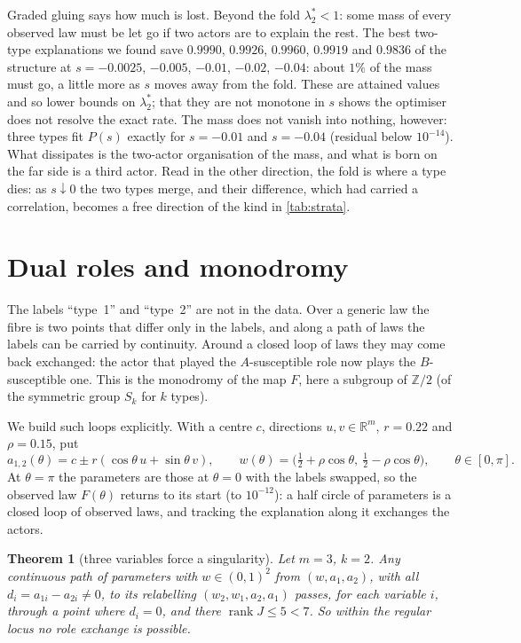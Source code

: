 \documentclass[11pt]{article}
\newtheorem{theorem}{Theorem}\newtheorem{proposition}[theorem]{Proposition}\newtheorem{corollary}[theorem]{Corollary}
\theoremstyle{definition}\newtheorem{definition}[theorem]{Definition}\newtheorem{remark}[theorem]{Remark}\newtheorem{example}[theorem]{Example}
\newcommand{\R}{\mathbb R}
\DeclareMathOperator{\rank}{rank}\DeclareMathOperator{\im}{im}\DeclareMathOperator{\coker}{coker}\DeclareMathOperator{\Spec}{Spec}
\begin{document}
Graded gluing says how much is lost. Beyond the fold $\lambda^*_2<1$: some mass of every observed law must be let go if two actors are to
explain the rest. The best two-type explanations we found save $0.9990$, $0.9926$, $0.9960$, $0.9919$ and $0.9836$ of the structure at $s=-0.0025$, $-0.005$, $-0.01$, $-0.02$, $-0.04$: about $1\%$ of the mass must go, a little more as $s$ moves away from the fold. These are attained values and so lower bounds on $\lambda^*_2$; that they are not monotone in $s$ shows the optimiser does not resolve the exact rate. The mass does not vanish into nothing, however: three
types fit $P(s)$ exactly for $s=-0.01$ and $s=-0.04$ (residual below $10^{-14}$). What dissipates is the two-actor organisation of the
mass, and what is born on the far side is a third actor. Read in the other direction, the fold is where a type dies: as $s\downarrow0$
the two types merge, and their difference, which had carried a correlation, becomes a free direction of the kind in \cref{tab:strata}.

\section{Dual roles and monodromy}\label{sec:monodromy}

The labels ``type~1'' and ``type~2'' are not in the data. Over a generic law the fibre is two points that differ only in the labels, and
along a path of laws the labels can be carried by continuity. Around a closed loop of laws they may come back exchanged: the actor that
played the $A$-susceptible role now plays the $B$-susceptible one. This is the monodromy of the map $F$, here a subgroup of $\mathbb Z/2$
(of the symmetric group $S_k$ for $k$ types).

We build such loops explicitly. With a centre $c$, directions $u,v\in\R^m$, $r=0.22$ and $\rho=0.15$, put
\[
  a_{1,2}(\theta)=c\pm r(\cos\theta\,u+\sin\theta\,v),\qquad w(\theta)=\big(\tfrac12+\rho\cos\theta,\ \tfrac12-\rho\cos\theta\big),
  \qquad\theta\in[0,\pi].
\]
At $\theta=\pi$ the parameters are those at $\theta=0$ with the labels swapped, so the observed law $F(\theta)$ returns to its start (to
$10^{-12}$): a half circle of parameters is a closed loop of observed laws, and tracking the explanation along it exchanges the actors.

\begin{theorem}[three variables force a singularity]\label{thm:m3}
Let $m=3$, $k=2$. Any continuous path of parameters with $w\in(0,1)^2$ from $(w,a_1,a_2)$, with all $d_i=a_{1i}-a_{2i}\neq0$, to its
relabelling $(w_2,w_1,a_2,a_1)$ passes, for each variable $i$, through a point where $d_i=0$, and there $\rank J\le5<7$.
So within the regular locus no role exchange is possible.
\end{theorem}
\end{document}
